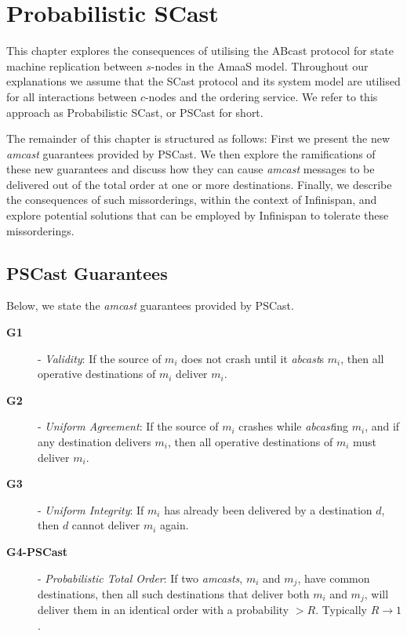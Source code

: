 \chapter{Probabilistic SCast}

    \graphicspath{{Chapter5-PSCast/Figs/Vector/}{Chapter5-PSCast/Figs/}}

This chapter explores the consequences of utilising the \textsf{ABcast} protocol for state machine replication between $s$-nodes in the \textsf{AmaaS} model.  Throughout our explanations we assume that the \textsf{SCast} protocol and its system model are utilised for all interactions between $c$-nodes and the ordering service.  We refer to this approach as Probabilistic \textsf{SCast}, or \textsf{PSCast} for short. 

The remainder of this chapter is structured as follows: First we present the new \emph{amcast} guarantees provided by \textsf{PSCast}.  We then explore the ramifications of these new guarantees and discuss how they can cause \emph{amcast} messages to be delivered out of the total order at one or more destinations.  Finally, we describe the consequences of such missorderings, within the context of Infinispan, and explore potential solutions that can be employed by Infinispan to tolerate these missorderings.  

\newpage
\section{PSCast Guarantees}
Below, we state the \emph{amcast} guarantees provided by \textsf{PSCast}.  
   
    \begin{description}
        \item [\textbf{G1}] - \emph{Validity}: If the source of $m_i$ does not crash until it \emph{abcast}s $m_i$, then all operative destinations of $m_i$ deliver $m_i$.
       
        \item [\textbf{G2}] - \emph{Uniform Agreement}: If the source of $m_i$ crashes while \emph{abcast}ing $m_i$, and if any destination delivers $m_i$, then all operative
destinations of $m_i$ must deliver $m_i$.
        
        \item [\textbf{G3}] - \emph{Uniform Integrity}: If $m_i$ has already been delivered by a destination $d$, then $d$ cannot deliver $m_i$ again.  
       
        \item [\textbf{G4-PSCast}] - \emph{Probabilistic Total Order}: If two \emph{\emph{amcast}s}, $m_i$ and $m_j$, have common destinations, then all such destinations that deliver both $m_i$ and $m_j$, will deliver them in an identical order with a probability $> R$.  Typically $R \rightarrow 1$.
\end{description}

